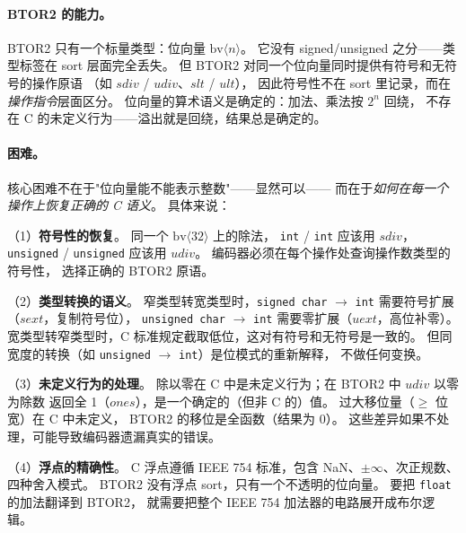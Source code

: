 \documentclass[11pt,a4paper]{article}
\begin{document}
\paragraph{BTOR2 的能力。}
BTOR2 只有一个标量类型：位向量 $\mathrm{bv}\langle n \rangle$。
它没有 signed/unsigned 之分——类型标签在 sort 层面完全丢失。
但 BTOR2 对同一个位向量同时提供有符号和无符号的操作原语
（如 $\mathit{sdiv}$ / $\mathit{udiv}$、$\mathit{slt}$ / $\mathit{ult}$），
因此符号性不在 sort 里记录，而在\emph{操作指令}层面区分。
位向量的算术语义是确定的：加法、乘法按 $2^n$ 回绕，
不存在 C 的未定义行为——溢出就是回绕，结果总是确定的。

\paragraph{困难。}
核心困难不在于"位向量能不能表示整数"——显然可以——
而在于\emph{如何在每一个操作上恢复正确的 C 语义}。
具体来说：

（1）\textbf{符号性的恢复}。
同一个 $\mathrm{bv}\langle 32 \rangle$ 上的除法，
\texttt{int} / \texttt{int} 应该用 $\mathit{sdiv}$，
\texttt{unsigned} / \texttt{unsigned} 应该用 $\mathit{udiv}$。
编码器必须在每个操作处查询操作数类型的符号性，
选择正确的 BTOR2 原语。

（2）\textbf{类型转换的语义}。
窄类型转宽类型时，\texttt{signed char} $\to$ \texttt{int}
需要符号扩展（$\mathit{sext}$，复制符号位），
\texttt{unsigned char} $\to$ \texttt{int} 需要零扩展（$\mathit{uext}$，高位补零）。
宽类型转窄类型时，C 标准规定截取低位，这对有符号和无符号是一致的。
但同宽度的转换（如 \texttt{unsigned} $\to$ \texttt{int}）是位模式的重新解释，
不做任何变换。

（3）\textbf{未定义行为的处理}。
除以零在 C 中是未定义行为；在 BTOR2 中 $\mathit{udiv}$ 以零为除数
返回全 1（$\mathit{ones}$），是一个确定的（但非 C 的）值。
过大移位量（$\geq$ 位宽）在 C 中未定义，
BTOR2 的移位是全函数（结果为 0）。
这些差异如果不处理，可能导致编码器遗漏真实的错误。

（4）\textbf{浮点的精确性}。
C 浮点遵循 IEEE 754 标准，包含 NaN、$\pm\infty$、次正规数、
四种舍入模式。
BTOR2 没有浮点 sort，只有一个不透明的位向量。
要把 \texttt{float} 的加法翻译到 BTOR2，
就需要把整个 IEEE 754 加法器的电路展开成布尔逻辑。
\end{document}
